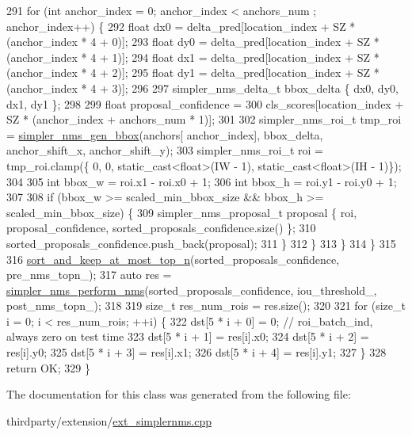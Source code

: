 \begin{DoxyCode}
291                 \textcolor{keywordflow}{for} (\textcolor{keywordtype}{int} anchor\_index = 0; anchor\_index < anchors\_num ; anchor\_index++) \{
292                     \textcolor{keywordtype}{float} dx0 = delta\_pred[location\_index + SZ * (anchor\_index * 4 + 0)];
293                     \textcolor{keywordtype}{float} dy0 = delta\_pred[location\_index + SZ * (anchor\_index * 4 + 1)];
294                     \textcolor{keywordtype}{float} dx1 = delta\_pred[location\_index + SZ * (anchor\_index * 4 + 2)];
295                     \textcolor{keywordtype}{float} dy1 = delta\_pred[location\_index + SZ * (anchor\_index * 4 + 3)];
296 
297                     simpler\_nms\_delta\_t bbox\_delta \{ dx0, dy0, dx1, dy1 \};
298 
299                     \textcolor{keywordtype}{float} proposal\_confidence =
300                             cls\_scores[location\_index + SZ * (anchor\_index + anchors\_num * 1)];
301 
302                     simpler\_nms\_roi\_t tmp\_roi = \hyperlink{namespaceInferenceEngine_1_1Extensions_1_1Cpu_aa02aa9d3ca8d6c473e44d1cd7d4f11dd}{simpler\_nms\_gen\_bbox}(anchors[
      anchor\_index], bbox\_delta, anchor\_shift\_x, anchor\_shift\_y);
303                     simpler\_nms\_roi\_t roi = tmp\_roi.clamp(\{ 0, 0, \textcolor{keyword}{static\_cast<}\textcolor{keywordtype}{float}\textcolor{keyword}{>}(IW - 1), 
      static\_cast<float>(IH - 1)\});
304 
305                     \textcolor{keywordtype}{int} bbox\_w = roi.x1 - roi.x0 + 1;
306                     \textcolor{keywordtype}{int} bbox\_h = roi.y1 - roi.y0 + 1;
307 
308                     \textcolor{keywordflow}{if} (bbox\_w >= scaled\_min\_bbox\_size && bbox\_h >= scaled\_min\_bbox\_size) \{
309                         simpler\_nms\_proposal\_t proposal \{ roi, proposal\_confidence, 
      sorted\_proposals\_confidence.size() \};
310                         sorted\_proposals\_confidence.push\_back(proposal);
311                     \}
312                 \}
313             \}
314         \}
315 
316         \hyperlink{namespaceInferenceEngine_1_1Extensions_1_1Cpu_a9ab5785b0943b51af3a2668ae9df0e11}{sort\_and\_keep\_at\_most\_top\_n}(sorted\_proposals\_confidence, pre\_nms\_topn\_);
317         \textcolor{keyword}{auto} res = \hyperlink{namespaceInferenceEngine_1_1Extensions_1_1Cpu_a6cef0ac4faf74f33e53449ba39304914}{simpler\_nms\_perform\_nms}(sorted\_proposals\_confidence, 
      iou\_threshold\_, post\_nms\_topn\_);
318 
319         \textcolor{keywordtype}{size\_t} res\_num\_rois = res.size();
320 
321         \textcolor{keywordflow}{for} (\textcolor{keywordtype}{size\_t} i = 0; i < res\_num\_rois; ++i) \{
322             dst[5 * i + 0] = 0;    \textcolor{comment}{// roi\_batch\_ind, always zero on test time}
323             dst[5 * i + 1] = res[i].x0;
324             dst[5 * i + 2] = res[i].y0;
325             dst[5 * i + 3] = res[i].x1;
326             dst[5 * i + 4] = res[i].y1;
327         \}
328         \textcolor{keywordflow}{return} OK;
329     \}
\end{DoxyCode}


The documentation for this class was generated from the following file\+:\begin{DoxyCompactItemize}
\item 
thirdparty/extension/\hyperlink{ext__simplernms_8cpp}{ext\+\_\+simplernms.\+cpp}\end{DoxyCompactItemize}
